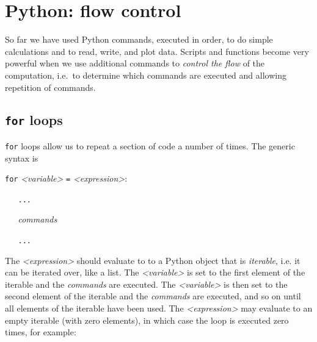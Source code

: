 \section{Python: flow control}

So far we have used Python commands, executed in order, to do simple
calculations and to read, write, and plot data. Scripts and functions
become very powerful when we use additional commands to
\textit{control the flow} of the computation, i.e.\ to determine which
commands are executed and allowing repetition of commands.

\subsection{\texttt{for} loops}

\texttt{for} loops allow us to repeat a section of code a number of times. The generic
syntax is

\vspace{3mm}

\noindent
\texttt{for} \textit{<variable>} \texttt{=} \textit{<expression>}:

\noindent
\texttt{\ \ \ ...}

\noindent
\textit{\ \ \ commands}

\noindent
\texttt{\ \ \ ...}

\vspace{1mm}




\vspace{3mm}

\noindent
The \textit{<expression>} should evaluate to to a Python object that is \textit{iterable}, i.e. it can be iterated over, like a list.
The \textit{<variable>} is set to the first element of the iterable
and the \textit{commands} are executed. The \textit{<variable>} is then set to the
second element of the iterable and the \textit{commands} are executed, and so on
until all elements of the iterable have been used.
The \textit{<expression>} may evaluate to an empty iterable (with zero elements),
in which case the loop is executed zero times, for example:
 




